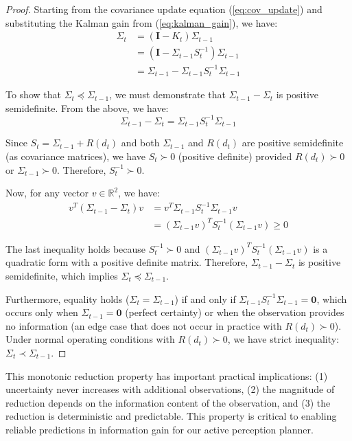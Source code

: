 \begin{proof}
Starting from the covariance update equation (\ref{eq:cov_update}) and substituting the Kalman gain from (\ref{eq:kalman_gain}), we have:
\begin{align}
    \Sigma_t &= (\mathbf{I} - K_t) \Sigma_{t-1} \\
    &= (\mathbf{I} - \Sigma_{t-1} S_t^{-1}) \Sigma_{t-1} \\
    &= \Sigma_{t-1} - \Sigma_{t-1} S_t^{-1} \Sigma_{t-1}
\end{align}

To show that $\Sigma_t \preceq \Sigma_{t-1}$, we must demonstrate that $\Sigma_{t-1} - \Sigma_t$ is positive semidefinite. From the above, we have:
\begin{equation}
    \Sigma_{t-1} - \Sigma_t = \Sigma_{t-1} S_t^{-1} \Sigma_{t-1}
\end{equation}

Since $S_t = \Sigma_{t-1} + R(d_t)$ and both $\Sigma_{t-1}$ and $R(d_t)$ are positive semidefinite (as covariance matrices), we have $S_t \succ 0$ (positive definite) provided $R(d_t) \succ 0$ or $\Sigma_{t-1} \succ 0$. Therefore, $S_t^{-1} \succ 0$.

Now, for any vector $v \in \mathbb{R}^2$, we have:
\begin{align}
    v^T (\Sigma_{t-1} - \Sigma_t) v &= v^T \Sigma_{t-1} S_t^{-1} \Sigma_{t-1} v \\
    &= (\Sigma_{t-1} v)^T S_t^{-1} (\Sigma_{t-1} v) \geq 0
\end{align}

The last inequality holds because $S_t^{-1} \succ 0$ and $(\Sigma_{t-1} v)^T S_t^{-1} (\Sigma_{t-1} v)$ is a quadratic form with a positive definite matrix. Therefore, $\Sigma_{t-1} - \Sigma_t$ is positive semidefinite, which implies $\Sigma_t \preceq \Sigma_{t-1}$.

Furthermore, equality holds ($\Sigma_t = \Sigma_{t-1}$) if and only if $\Sigma_{t-1} S_t^{-1} \Sigma_{t-1} = \mathbf{0}$, which occurs only when $\Sigma_{t-1} = \mathbf{0}$ (perfect certainty) or when the observation provides no information (an edge case that does not occur in practice with $R(d_t) \succ 0$). Under normal operating conditions with $R(d_t) \succ 0$, we have strict inequality: $\Sigma_t \prec \Sigma_{t-1}$.
\end{proof}

This monotonic reduction property has important practical implications: (1) uncertainty never increases with additional observations, (2) the magnitude of reduction depends on the information content of the observation, and (3) the reduction is deterministic and predictable. This property is critical to enabling reliable predictions in information gain for our active perception planner.

